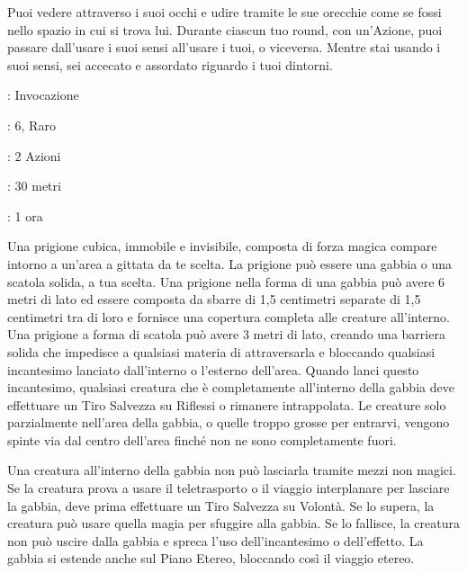 \begin{multicols}{2}
Puoi vedere attraverso i suoi occhi e udire tramite le sue orecchie come se fossi nello spazio in cui si trova lui. Durante ciascun tuo round, con un'Azione, puoi passare dall'usare i suoi sensi all'usare i tuoi, o viceversa. Mentre stai usando i suoi sensi, sei accecato e assordato riguardo i tuoi dintorni.

\noindent\colorbox{OBSSgold!10}{
\begin{minipage}{0.95\linewidth}
\begin{description}[noitemsep, topsep=0pt, parsep=0pt, partopsep=0pt, leftmargin=0cm, labelwidth=1.3cm]
	\item[\textbf{Lista}]: Invocazione
	\item[\textbf{Livello}]: 6, Raro
	\item[\textbf{Lancio}]: 2 Azioni
	\item[\textbf{Gittata}]: 30 metri
	\item[\textbf{Durata}]: 1 ora
\end{description}
\end{minipage}}\smallskip

Una prigione cubica, immobile e invisibile, composta di forza magica compare intorno a un'area a gittata da te scelta. La prigione può essere una gabbia o una scatola solida, a tua scelta. Una prigione nella forma di una gabbia può avere 6 metri di lato ed essere composta da sbarre di 1,5 centimetri separate di 1,5 centimetri tra di loro e fornisce una copertura completa alle creature all'interno. Una prigione a forma di scatola può avere 3 metri di lato, creando una barriera solida che impedisce a qualsiasi materia di attraversarla e bloccando qualsiasi incantesimo lanciato dall'interno o l'esterno dell'area. Quando lanci questo incantesimo, qualsiasi creatura che è completamente all'interno della gabbia deve effettuare un Tiro Salvezza su Riflessi o rimanere intrappolata. Le creature solo parzialmente nell'area della gabbia, o quelle troppo grosse per entrarvi, vengono spinte via dal centro dell'area finché non ne sono completamente fuori.

Una creatura all'interno della gabbia non può lasciarla tramite mezzi non magici. Se la creatura prova a usare il teletrasporto o il viaggio interplanare per lasciare la gabbia, deve prima effettuare un Tiro Salvezza su Volontà. Se lo supera, la creatura può usare quella magia per sfuggire alla gabbia. Se lo fallisce, la creatura non può uscire dalla gabbia e spreca l'uso dell'incantesimo o dell'effetto. La gabbia si estende anche sul Piano Etereo, bloccando così il viaggio etereo.


\end{multicols}

